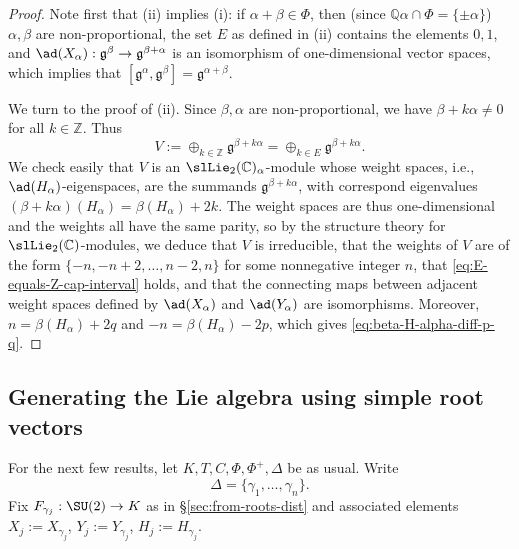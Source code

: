 \documentclass[reqno]{amsart} 
\begin{document}
\begin{proof}
  Note first that (ii) implies (i): if $\alpha+\beta \in \Phi$, then (since $\mathbb{Q} \alpha \cap \Phi = \{\pm \alpha \}$) $\alpha,\beta$ are non-proportional, the set $E$ as defined in (ii) contains the elements $0,1$, and $\ad(X_\alpha) : \mathfrak{g}^{\beta} \rightarrow \mathfrak{g}^{\beta+\alpha}$ is an isomorphism of one-dimensional vector spaces, which implies that $[\mathfrak{g}^\alpha,\mathfrak{g}^{\beta}] = \mathfrak{g}^{\alpha+\beta}$.

  We turn to the proof of (ii).  Since $\beta, \alpha$ are non-proportional, we have $\beta + k \alpha \neq 0$ for all $k \in \mathbb{Z}$.  Thus
  \begin{equation}
    V := \oplus_{k \in \mathbb{Z}} \mathfrak{g}^{\beta + k
      \alpha}
    =
    \oplus _{k \in E}
    \mathfrak{g}^{\beta + k \alpha}.
  \end{equation}
  We check easily that $V$ is an $\slLie_2(\mathbb{C})_\alpha$-module whose weight spaces, i.e., $\ad(H_\alpha)$-eigenspaces, are the summands $\mathfrak{g}^{\beta+k \alpha}$, with correspond eigenvalues $(\beta+k \alpha)(H_\alpha) = \beta(H_\alpha) + 2 k$.  The weight spaces are thus one-dimensional and the weights all have the same parity, so by the structure theory for $\slLie_2(\mathbb{C})$-modules, we deduce that $V$ is irreducible, that the weights of $V$ are of the form $\{-n, -n+2, \dotsc, n-2, n\}$ for some nonnegative integer $n$, that \eqref{eq:E-equals-Z-cap-interval} holds, and that the connecting maps between adjacent weight spaces defined by $\ad(X_\alpha)$ and $\ad(Y_\alpha)$ are isomorphisms.  Moreover, $n = \beta(H_\alpha) + 2 q$ and $-n = \beta(H_\alpha) - 2 p$, which gives \eqref{eq:beta-H-alpha-diff-p-q}.
\end{proof}


\subsection{Generating the Lie algebra using simple root
  vectors}\label{sec:gener-lie-algebra}
For the next few results, let $K,T,C,\Phi,\Phi^+,\Delta$ be as usual.  Write
\begin{equation*}
  \Delta = \{\gamma_1,\dotsc,\gamma_n\}.
\end{equation*}
Fix $F_{\gamma_j} : \SU(2) \rightarrow K$ as in \S\ref{sec:from-roots-dist} and associated elements $X_j := X_{\gamma_j}$, $Y_j := Y_{\gamma_j}$, $H_j := H_{\gamma_j}$.
\end{document}
